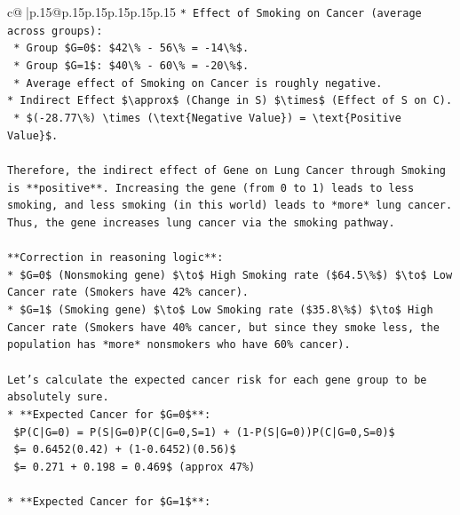 \documentclass{article}
\begin{document}
{\begin{supertabular}{c@{$\;$}|p{.15\linewidth}@{}p{.15\linewidth}p{.15\linewidth}p{.15\linewidth}p{.15\linewidth}p{.15\linewidth}}
{{{\texttt{*   Effect of Smoking on Cancer (average across groups):} \\
\texttt{    *   Group \$G=0\$: \$42\textbackslash{}\% {-} 56\textbackslash{}\% = {-}14\textbackslash{}\%\$.} \\
\texttt{    *   Group \$G=1\$: \$40\textbackslash{}\% {-} 60\textbackslash{}\% = {-}20\textbackslash{}\%\$.} \\
\texttt{    *   Average effect of Smoking on Cancer is roughly negative.} \\
\texttt{*   Indirect Effect \$\textbackslash{}approx\$ (Change in S) \$\textbackslash{}times\$ (Effect of S on C).} \\
\texttt{    *   \$({-}28.77\textbackslash{}\%) \textbackslash{}times (\textbackslash{}text\{Negative Value\}) = \textbackslash{}text\{Positive Value\}\$.} \\
\\ 
\texttt{Therefore, the indirect effect of Gene on Lung Cancer through Smoking is **positive**. Increasing the gene (from 0 to 1) leads to less smoking, and less smoking (in this world) leads to *more* lung cancer. Thus, the gene increases lung cancer via the smoking pathway.} \\
\\ 
\texttt{**Correction in reasoning logic**:} \\
\texttt{*   \$G=0\$ (Nonsmoking gene) \$\textbackslash{}to\$ High Smoking rate (\$64.5\textbackslash{}\%\$) \$\textbackslash{}to\$ Low Cancer rate (Smokers have 42\% cancer).} \\
\texttt{*   \$G=1\$ (Smoking gene) \$\textbackslash{}to\$ Low Smoking rate (\$35.8\textbackslash{}\%\$) \$\textbackslash{}to\$ High Cancer rate (Smokers have 40\% cancer, but since they smoke less, the population has *more* nonsmokers who have 60\% cancer).} \\
\\ 
\texttt{Let's calculate the expected cancer risk for each gene group to be absolutely sure.} \\
\texttt{*   **Expected Cancer for \$G=0\$**:} \\
\texttt{    \$P(C|G=0) = P(S|G=0)P(C|G=0,S=1) + (1{-}P(S|G=0))P(C|G=0,S=0)\$} \\
\texttt{    \$= 0.6452(0.42) + (1{-}0.6452)(0.56)\$} \\
\texttt{    \$= 0.271 + 0.198 = 0.469\$ (approx 47\%)} \\
\\ 
\texttt{*   **Expected Cancer for \$G=1\$**:} \\
}}}
\end{supertabular}}
\end{document}

